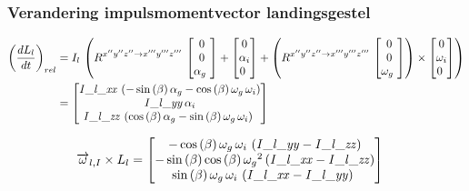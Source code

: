 \subsubsection{Verandering impulsmomentvector landingsgestel}

\begin{align*}
\left(\frac{dL_{l}}{dt}\right)_{rel}&=I_{l}\,\left(R^{x''y''z'' \rightarrow x'''y'''z'''}\,\begin{bmatrix}
0\\
0\\
\alpha_{g}\
\end{bmatrix}
+\begin{bmatrix}
0\\
\alpha_{i}\\
0\
\end{bmatrix}
+\left(R^{x''y''z'' \rightarrow x'''y'''z'''}\,\begin{bmatrix}
0\\
0\\
\omega_{g}\
\end{bmatrix}
\right)\times\begin{bmatrix}
0\\
\omega_{i}\\
0\
\end{bmatrix}
\right)\\
&=\begin{bmatrix}
{\it I\_l\_xx}\, \left( -\sin \left( \beta
 \right) \alpha_{g}-\cos \left( \beta \right) \omega_{g}\,\omega_{i}
 \right) \\ 
 {\it I\_l\_yy}\,\alpha_{i}
\\ 
%
{\it I\_l\_zz}\, \left( \cos \left( \beta
 \right) \alpha_{g}-\sin \left( \beta \right) \omega_{g}\,\omega_{i}
 \right) \
\end{bmatrix}
\end{align*}

\begin{equation*}
\begin{split}
\overrightarrow{\omega}_{l,I}\times L_{l}&=\begin{bmatrix}
-\cos \left( \beta \right) \omega_{g}\,
\omega_{i}\, \left( {\it I\_l\_yy}-{\it I\_l\_zz} \right) 
\\ 
-\sin \left( \beta \right) \cos \left( \beta
 \right) {\omega_{g}}^{2} \left( {\it I\_l\_xx}-{\it I\_l\_zz}
 \right) \\ 
 \sin \left( \beta \right) \omega_{g}\,
\omega_{i}\, \left( {\it I\_l\_xx}-{\it I\_l\_yy} \right) \
\end{bmatrix}
\end{split}
\end{equation*}

